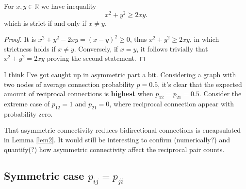 \begin{lemma} \label{lem2}
  For $x,y \in \mathbb{R}$ we have inequality
  \[
  x^2 + y^2 \geq 2xy.
  \]
  which is strict if and only if $x \neq y$,
  \end{lemma}

\begin{proof}
  It is $x^2 + y^2 - 2xy = (x - y)^2 \geq 0 $, thus $  x^2 + y^2 \geq 2xy$, in which strictness holds if $x \neq y$. Conversely, if $x=y$, it follows trivially that $x^2 + y^2 = 2xy$ proving the second statement.
\end{proof}

I think I've got caught up in asymmetric part a bit. Considering a graph with two nodes of average connection probability $p=0.5$, it's clear that the expected amount of reciprocal connections is \textbf{highest} when $p_{12} = p_{21} = 0.5$. Consider the extreme case of $p_{12} = 1$ and $p_{21} = 0$, where reciprocal connection appear with probability zero.

That asymmetric connectivity reduces bidirectional connections is encapsulated in Lemma \ref{lem2}. It would still be interesting to confirm (numerically?) and quantify(?) how asymmetric connectivity affect the reciprocal pair counts.

\subsection{Symmetric case  $p_{ij} =  p _{ji}$}


